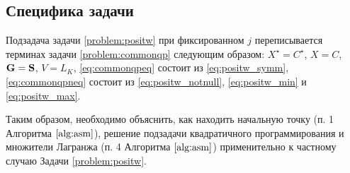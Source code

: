 \documentclass[10pt]{article}
\begin{document}
\subsection{Специфика задачи}
Подзадача задачи \ref{problem:positw} при фиксированном $j$ переписывается терминах задачи \ref{problem:commonqp} следующим образом: $X^\star = C^\star$, $X = C$, $\mathbf{G} = \mathbf{S}$, $V = L_K$, \eqref{eq:commonqpeq} состоит из \eqref{eq:positw_symm}, \eqref{eq:commonqpneq} состоит из \eqref{eq:positw_notnull}, \eqref{eq:positw_min} и \eqref{eq:positw_max}.

Таким образом, необходимо объяснить, как находить начальную точку (п. 1 Алгоритма $\ref{alg:asm}$), решение подзадачи квадратичного программирования и множители Лагранжа (п. 4 Алгоритма $\ref{alg:asm}$) применительно к частному случаю  Задачи \ref{problem:positw}. 
\end{document}
